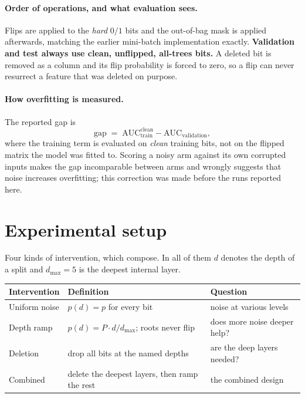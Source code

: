 \documentclass[11pt,a4paper]{article}
\begin{document}
\paragraph{Order of operations, and what evaluation sees.}
Flips are applied to the \emph{hard} $0/1$ bits and the out-of-bag mask is
applied afterwards, matching the earlier mini-batch implementation exactly.
\textbf{Validation and test always use clean, unflipped, all-trees bits.} A
deleted bit is removed as a column and its flip probability is forced to zero,
so a flip can never resurrect a feature that was deleted on purpose.

\paragraph{How overfitting is measured.}
The reported gap is
\[
\text{gap} \;=\; \mathrm{AUC}_{\text{train}}^{\text{clean}} - \mathrm{AUC}_{\text{validation}} ,
\]
where the training term is evaluated on \emph{clean} training bits, not on the
flipped matrix the model was fitted to. Scoring a noisy arm against its own
corrupted inputs makes the gap incomparable between arms and wrongly suggests
that noise increases overfitting; this correction was made before the runs
reported here.

\section{Experimental setup}

Four kinds of intervention, which compose. In all of them $d$ denotes the depth
of a split and $d_{\max} = 5$ is the deepest internal layer.

\begin{table}[h]\centering\small
\begin{tabular}{lll}
\toprule
\textbf{Intervention} & \textbf{Definition} & \textbf{Question}\\
\midrule
Uniform noise & $p(d) = p$ for every bit & noise at various levels\\
Depth ramp & $p(d) = P \cdot d / d_{\max}$; roots never flip & does more noise deeper help?\\
Deletion & drop all bits at the named depths & are the deep layers needed?\\
Combined & delete the deepest layers, then ramp the rest & the combined design\\
\bottomrule
\end{tabular}
\end{table}
\end{document}
